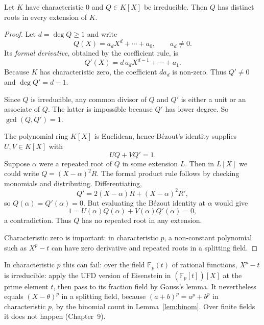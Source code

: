 \begin{lemma}\label{lem:sep}
Let $K$ have characteristic $0$ and $Q\in K[X]$ be irreducible. Then $Q$ has distinct roots in every extension of $K$.
\end{lemma}
\begin{proof}
Let $d=\deg Q\ge1$ and write
\[
Q(X)=a_dX^d+\cdots+a_0,
\qquad a_d\ne0.
\]
Its \emph{formal derivative}, obtained by the coefficient rule, is
\[
Q'(X)=d\,a_dX^{d-1}+\cdots+a_1.
\]
Because $K$ has characteristic zero,
the coefficient $da_d$ is non-zero.
Thus $Q'\ne0$ and $\deg Q'=d-1$.

Since $Q$ is irreducible, any
common divisor of $Q$ and $Q'$
is either a unit or an associate
of $Q$. The latter is impossible
because $Q'$ has lower degree.
So $\gcd(Q,Q')=1$.

The polynomial ring $K[X]$ is
Euclidean, hence Bézout's identity
supplies $U,V\in K[X]$ with
\[
UQ+VQ'=1.
\]
Suppose $\alpha$ were a repeated
root of $Q$ in some extension $L$.
Then in $L[X]$ we could write
$Q=(X-\alpha)^2R$. The formal product rule follows by checking monomials and distributing.
Differentiating,
\[
Q'=2(X-\alpha)R+
(X-\alpha)^2R',
\]
so $Q(\alpha)=Q'(\alpha)=0$.
But evaluating the Bézout identity
at $\alpha$ would give
\[
1=U(\alpha)Q(\alpha)+
V(\alpha)Q'(\alpha)=0,
\]
a contradiction. Thus $Q$ has
no repeated root in any extension.

Characteristic zero is important:
in characteristic $p$, a non-constant
polynomial such as $X^p-t$ can have
zero derivative and repeated roots
in a splitting field.
\end{proof}

\begin{remark}
In characteristic $p$ this can fail: over the field $\mathbb F_p(t)$ of rational functions, $X^p-t$ is irreducible: apply the UFD version of Eisenstein
in $(\mathbb F_p[t])[X]$ at the prime element $t$, then pass to its
fraction field by Gauss's lemma. It nevertheless equals $(X-\theta)^p$ in a splitting field, because $(a+b)^p=a^p+b^p$ in characteristic $p$, by the binomial count in Lemma~\ref{lem:binom}. Over finite fields it does not happen (Chapter~9).
\end{remark}

